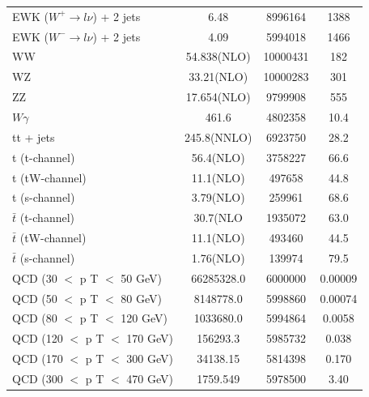 \begin{longtable}{| l | c | c | c |}
  EWK ($W^{+} \rightarrow l\nu$) + 2 jets                       & 6.48          &  8996164 &    1388 \\
  EWK ($W^{-} \rightarrow l\nu$) + 2 jets                       & 4.09          &  5994018 &    1466 \\ 
  WW                                                            & 54.838(NLO)   & 10000431 &     182 \\
  WZ                                                            & 33.21(NLO)    & 10000283 &     301 \\
  ZZ                                                            & 17.654(NLO)   &  9799908 &     555 \\
  $W \gamma$                                                    & 461.6         &  4802358 &    10.4 \\
  tt + jets                                                     & 245.8(NNLO)   &  6923750 &    28.2 \\
  t (t-channel)                                                 & 56.4(NLO)     &  3758227 &    66.6 \\
  t (tW-channel)                                                & 11.1(NLO)     &   497658 &    44.8 \\
  t (s-channel)                                                 & 3.79(NLO)     &   259961 &    68.6 \\
  $\bar{t}$ (t-channel)                                         & 30.7(NLO      &  1935072 &    63.0 \\
  $\bar{t}$ (tW-channel)                                        & 11.1(NLO)     &   493460 &    44.5 \\
  $\bar{t}$ (s-channel)                                         & 1.76(NLO)     &   139974 &    79.5 \\
  QCD (30 $<$ p T $<$ 50 GeV)                                   & 66285328.0    &  6000000 & 0.00009 \\
  QCD (50 $<$ p T $<$ 80 GeV)                                   & 8148778.0     &  5998860 & 0.00074 \\
  QCD (80 $<$ p T $<$ 120 GeV)                                  & 1033680.0     &  5994864 &  0.0058 \\
  QCD (120 $<$ p T $<$ 170 GeV)                                 & 156293.3      &  5985732 &   0.038 \\
  QCD (170 $<$ p T $<$ 300 GeV)                                 & 34138.15      &  5814398 &   0.170 \\
  QCD (300 $<$ p T $<$ 470 GeV)                                 & 1759.549      &  5978500 &    3.40 \\

\end{longtable}

